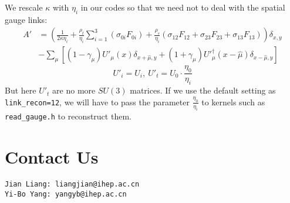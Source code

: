 \documentclass[12pt,fleqn]{article}
\def\be{\begin{equation}}
\def\ee{\end{equation}}
\begin{document}
We rescale $\kappa$ with $\eta_i$ in our codes so that we need not to deal with the spatial gauge links:
\be
\begin{split}
A' &= \left(\frac{1}{2\kappa\eta_i}
    + \frac{\rho_t}{\eta_i}\sum_{i=1}^3(\sigma_{0i}F_{0i})
    + \frac{\rho_s}{\eta_i}(\sigma_{12}F_{12}+\sigma_{23}F_{23}+\sigma_{13}F_{13})\right)\delta_{x,y}\\
    &- \sum_\mu \left[(1-\gamma_\mu){U'}_\mu(x)\delta_{x+\hat\mu,y}
    + (1+\gamma_\mu){U'}_\mu^\dagger(x-\hat\mu)\delta_{x-\hat\mu,y}\right]
\end{split}
\ee
\be
{U'}_i = U_i,~{U'}_t = U_0\cdot\frac{\eta_0}{\eta_i}
\ee
But here ${U'}_t$ are no more $SU(3)$ matrices. If we use the default setting as \verb|link_recon=12|,
we will have to pass the parameter $\frac{\eta_0}{\eta_i}$ to kernels such as \verb|read_gauge.h| to reconstruct
them.

\section{Contact Us}
\begin{verbatim}
Jian Liang: liangjian@ihep.ac.cn
Yi-Bo Yang: yangyb@ihep.ac.cn
\end{verbatim}
\end{document}
